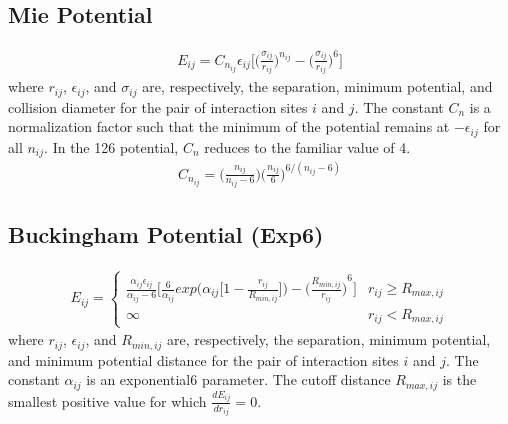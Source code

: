 \documentclass[letterpaper,10pt,english]{sphinxmanual}
\begin{document}
\subsection{Mie Potential}
\label{\detokenize{input_file:mie-potential}}\begin{equation*}
\begin{split}E_{ij} = C_{n_{ij}} \epsilon_{ij} \bigg[\bigg(\frac{\sigma_{ij}}{r_{ij}}\bigg)^{n_{ij}} - \bigg(\frac{\sigma_{ij}}{r_{ij}}\bigg)^6\bigg]\end{split}
\end{equation*}
\sphinxAtStartPar
where \(r_{ij}\), \(\epsilon_{ij}\), and \(\sigma_{ij}\) are, respectively, the separation, minimum potential, and collision diameter for the pair of interaction sites \(i\) and \(j\). The constant \(C_n\) is a normalization factor such that the minimum of the potential remains at \(-\epsilon_{ij}\) for all \(n_{ij}\). In the 12\sphinxhyphen{}6 potential, \(C_n\) reduces to the familiar value of 4.
\begin{equation*}
\begin{split}C_{n_{ij}} = \bigg(\frac{n_{ij}}{n_{ij} - 6} \bigg)\bigg(\frac{n_{ij}}{6} \bigg)^{6/(n_{ij} - 6)}\end{split}
\end{equation*}

\subsection{Buckingham Potential (Exp\sphinxhyphen{}6)}
\label{\detokenize{input_file:buckingham-potential-exp-6}}\begin{equation*}
\begin{split}E_{ij} =
\begin{cases}
  \frac{\alpha_{ij}\epsilon_{ij}}{\alpha_{ij}-6} \bigg[\frac{6}{\alpha_{ij}} exp\bigg(\alpha_{ij} \bigg[1-\frac{r_{ij}}{R_{min,ij}} \bigg]\bigg) - {\bigg(\frac{R_{min,ij}}{r_{ij}}\bigg)}^6 \bigg] &  r_{ij} \geq R_{max,ij} \\
  \infty & r_{ij} < R_{max,ij}
\end{cases}\end{split}
\end{equation*}
\sphinxAtStartPar
where \(r_{ij}\), \(\epsilon_{ij}\), and \(R_{min,ij}\) are, respectively, the separation, minimum potential, and minimum potential distance for the pair of interaction sites \(i\) and \(j\).
The constant \(\alpha_{ij}\) is an  exponential\sphinxhyphen{}6 parameter. The cutoff distance \(R_{max,ij}\) is the smallest positive value for which \(\frac{dE_{ij}}{dr_{ij}}=0\).
\end{document}

